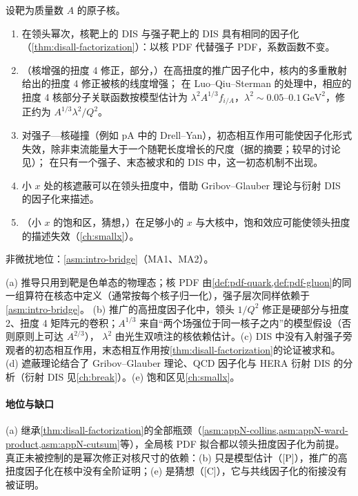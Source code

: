 \begin{proposition}\label{prop:disall-nuclear}
设靶为质量数 $A$ 的原子核。
\begin{enumerate}[label=(\alph*),leftmargin=2em,itemsep=1pt,topsep=2pt]
\item 在领头幂次，核靶上的 DIS 与强子靶上的 DIS 具有相同的因子化（\cref{thm:disall-factorization}）：以核 PDF 代替强子 PDF，系数函数不变。
\item （核增强的扭度 4 修正，部分，\tagP）在高扭度的推广因子化中\cite{QiuSterman1991a}，核内的多重散射给出的扭度 4 修正被核的线度增强；
在 Luo--Qiu--Sterman 的处理中\cite{Luo:1993ui,Luo:1994np}，相应的扭度 4 核部分子关联函数按模型估计为 $\lambda^2A^{1/3}f_{i/A}$，$\lambda^2\sim0.05$--$0.1\,\mathrm{GeV}^2$，修正约为 $A^{1/3}\lambda^2/Q^2$。
\item 对强子—核碰撞（例如 pA 中的 Drell--Yan），初态相互作用可能使因子化形式失效，除非束流能量大于一个随靶长度增长的尺度（据\cite{Bodwin:1988fs}的摘要；较早的讨论见\cite{BodwinBrodskyLepage1981}）；
在只有一个强子、末态被求和的 DIS 中，这一初态机制不出现。
\item 小 $x$ 处的核遮蔽可以在领头扭度中，借助 Gribov--Glauber 理论与衍射 DIS 的因子化来描述\cite{Frankfurt:2011cs}。
\item （小 $x$ 的饱和区，猜想，\tagC）在足够小的 $x$ 与大核中，饱和效应可能使领头扭度的描述失效（\cref{ch:smallx}）。
\end{enumerate}
非微扰地位：\cref{asm:intro-bridge}（MA1、MA2）。
\end{proposition}

\begin{proofsketch}
(a) 推导只用到靶是色单态的物理态；核 PDF 由\cref{def:pdf-quark,def:pdf-gluon}的同一组算符在核态中定义（通常按每个核子归一化），强子层次同样依赖于\cref{asm:intro-bridge}。
(b) 推广的高扭度因子化中\cite{QiuSterman1991a,QiuSterman1991b}，领头 $1/Q^2$ 修正是硬部分与扭度 2、扭度 4 矩阵元的卷积；$A^{1/3}$ 来自“两个场强位于同一核子之内”的模型假设（否则原则上可达 $A^{2/3}$）\cite{Guo:1997it}，
$\lambda^2$ 由光生双喷注的核依赖估计\cite{Luo:1993ui}。(c) DIS 中没有入射强子旁观者的初态相互作用，末态相互作用按\cref{thm:disall-factorization}的论证被求和。
(d) 遮蔽理论结合了 Gribov--Glauber 理论、QCD 因子化与 HERA 衍射 DIS 的分析\cite{Frankfurt:2011cs}（衍射 DIS 见\cref{ch:break}）。(e) 饱和区见\cref{ch:smallx}。
\end{proofsketch}

\paragraph{地位与缺口}
(a) 继承\cref{thm:disall-factorization}的全部瓶颈（\cref{asm:appN-collins,asm:appN-ward-product,asm:appN-cutsum}等），全局核 PDF 拟合都以领头扭度因子化为前提\cite{Eskola:2021nhw,Kovarik:2015cma,AbdulKhalek:2022fyi}。
真正未被控制的是幂次修正对核尺寸的依赖：(b) 只是模型估计（[P]），推广的高扭度因子化在核中没有全阶证明；(e) 是猜想（[C]），它与共线因子化的衔接没有被证明。

